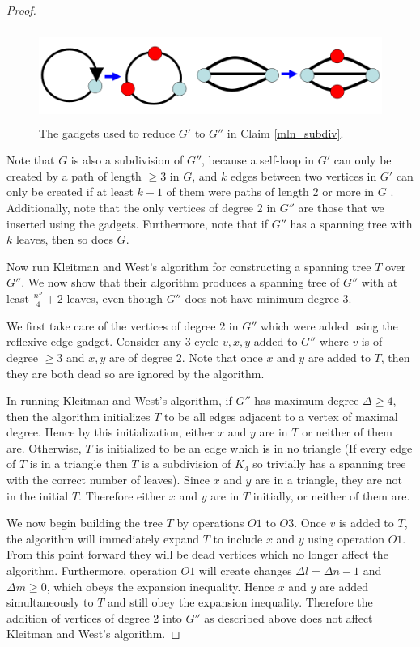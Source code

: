\documentclass[11pt]{report}
\begin{document}
\begin{proof}
\begin{figure}[t]
\begin{center}
\leavevmode
\includegraphics[height=30mm]{mln_gadgets_v0.png}
\end{center}
\caption{The gadgets used to reduce $G'$ to $G''$ in Claim \ref{mln_subdiv}. }
\end{figure}


Note that $G$ is also a subdivision of $G''$, because a self-loop in $G'$ can only be created by a path of length $\geq 3$ in $G$, and $k$ edges between two vertices in $G'$ can only be created if at least $k-1$ of them were paths of length 2 or more in $G$ . Additionally, note that the only vertices of degree 2 in $G''$ are those that we inserted using the gadgets. Furthermore, note that if $G''$ has a spanning tree with $k$ leaves, then so does $G$. 



Now run Kleitman and West's algorithm for constructing a spanning tree $T$ over $G''$. We now show that their algorithm produces a spanning tree of $G''$ with at least $\frac{n''}{4} +2$ leaves, even though $G''$ does not have minimum degree 3.  

We first take care of the vertices of degree 2 in $G''$ which were added using the reflexive edge gadget. Consider any 3-cycle $v,x,y$ added to $G''$ where $v$ is of degree $\geq 3$ and $x,y$ are of degree 2. Note that once $x$ and $y$ are added to $T$, then they are both dead so are ignored by the algorithm.

In running Kleitman and West's algorithm, if $G''$ has maximum degree $\Delta\geq 4$, then the algorithm initializes $T$ to be all edges adjacent to a vertex of maximal degree. Hence by this initialization, either $x$ and $y$ are in $T$ or neither of them are. Otherwise, $T$ is initialized to be an edge which is in no triangle (If every edge of $T$ is in a triangle then $T$ is a subdivision of $K_4$ so trivially has a spanning tree with the correct number of leaves). Since $x$ and $y$ are in a triangle, they are not in the initial $T$. Therefore either $x$ and $y$ are in $T$ initially, or neither of them are.

We now begin building the tree $T$ by operations $O1$ to $O3$. Once $v$ is added to $T$, the algorithm will immediately expand $T$ to include $x$ and $y$ using operation $O1$. From this point forward they will be dead vertices which no longer affect the algorithm. Furthermore, operation $O1$ will create changes $\Delta l = \Delta n - 1$ and $\Delta m\geq 0$, which obeys the expansion inequality. Hence $x$ and $y$ are added simultaneously to $T$ and still obey the expansion inequality. Therefore the addition of vertices of degree 2 into $G''$ as described above does not affect Kleitman and West's algorithm. 


\end{proof}
\end{document}
